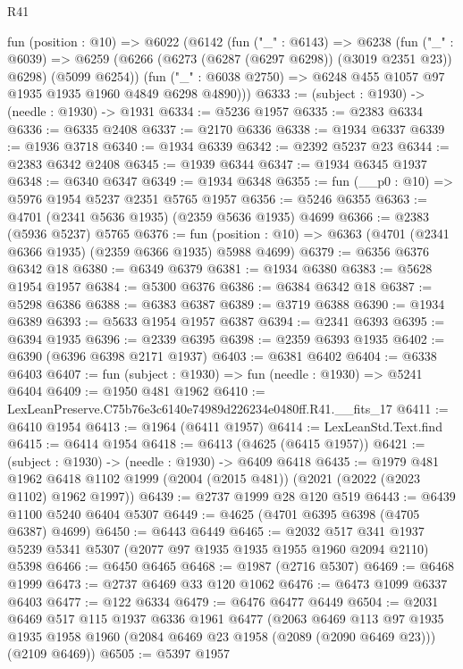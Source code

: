 \begin{lexlean}{R41}
\begin{coremodule}
  fun (position : @10) =>
  @6022
    (@6142
      (fun ("_" : @6143) =>
      @6238
        (fun ("_" : @6039) =>
        @6259 (@6266 (@6273 (@6287 (@6297 @6298)) (@3019 @2351 @23)) @6298) (@5099 @6254))
        (fun ("_" : @6038 @2750) => @6248 @455 @1057 @97 @1935 @1935 @1960 @4849 @6298 @4890)))
@6333 := (subject : @1930) -> (needle : @1930) -> @1931
@6334 := @5236 @1957
@6335 := @2383 @6334
@6336 := @6335 @2408
@6337 := @2170 @6336
@6338 := @1934 @6337
@6339 := @1936 @3718
@6340 := @1934 @6339
@6342 := @2392 @5237 @23
@6344 := @2383 @6342 @2408
@6345 := @1939 @6344
@6347 := @1934 @6345 @1937
@6348 := @6340 @6347
@6349 := @1934 @6348
@6355 := fun (__p0 : @10) => @5976 @1954 @5237 @2351 @5765 @1957
@6356 := @5246 @6355
@6363 := @4701 (@2341 @5636 @1935) (@2359 @5636 @1935) @4699
@6366 := @2383 (@5936 @5237) @5765
@6376 := fun (position : @10) => @6363 (@4701 (@2341 @6366 @1935) (@2359 @6366 @1935) @5988 @4699)
@6379 := @6356 @6376 @6342 @18
@6380 := @6349 @6379
@6381 := @1934 @6380
@6383 := @5628 @1954 @1957
@6384 := @5300 @6376
@6386 := @6384 @6342 @18
@6387 := @5298 @6386
@6388 := @6383 @6387
@6389 := @3719 @6388
@6390 := @1934 @6389
@6393 := @5633 @1954 @1957 @6387
@6394 := @2341 @6393
@6395 := @6394 @1935
@6396 := @2339 @6395
@6398 := @2359 @6393 @1935
@6402 := @6390 (@6396 @6398 @2171 @1937)
@6403 := @6381 @6402
@6404 := @6338 @6403
@6407 := fun (subject : @1930) => fun (needle : @1930) => @5241 @6404
@6409 := @1950 @481 @1962
@6410 := LexLeanPreserve.C75b76e3c6140e74989d226234e0480ff.R41.__fits_17
@6411 := @6410 @1954
@6413 := @1964 (@6411 @1957)
@6414 := LexLeanStd.Text.find
@6415 := @6414 @1954
@6418 := @6413 (@4625 (@6415 @1957))
@6421 := (subject : @1930) -> (needle : @1930) -> @6409 @6418
@6435 := @1979
    @481
    @1962
    @6418
    @1102
    @1999
    (@2004 (@2015 @481))
    (@2021 (@2022 (@2023 @1102) @1962 @1997))
@6439 := @2737 @1999 @28 @120 @519
@6443 := @6439 @1100 @5240 @6404 @5307
@6449 := @4625 (@4701 @6395 @6398 (@4705 @6387) @4699)
@6450 := @6443 @6449
@6465 := @2032
    @517
    @341
    @1937
    @5239
    @5341
    @5307
    (@2077 @97 @1935 @1935 @1955 @1960 @2094 @2110)
    @5398
@6466 := @6450 @6465
@6468 := @1987 (@2716 @5307)
@6469 := @6468 @1999
@6473 := @2737 @6469 @33 @120 @1062
@6476 := @6473 @1099 @6337 @6403
@6477 := @122 @6334
@6479 := @6476 @6477 @6449
@6504 := @2031
    @6469
    @517
    @115
    @1937
    @6336
    @1961
    @6477
    (@2063
      @6469
      @113
      @97
      @1935
      @1935
      @1958
      @1960
      (@2084 @6469 @23 @1958 (@2089 (@2090 @6469 @23)))
      (@2109 @6469))
@6505 := @5397 @1957

\end{coremodule}
\end{lexlean}
